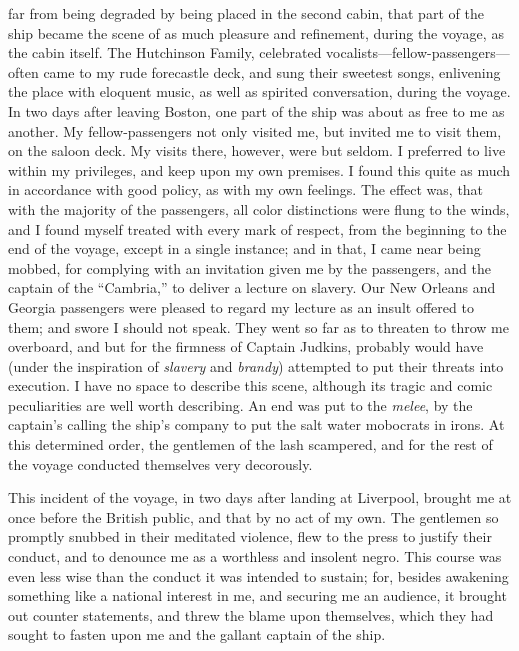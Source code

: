 far from being degraded by being placed in the second cabin, that part
of the ship became the scene of as much pleasure and refinement, during
the voyage, as the cabin itself. The Hutchinson Family, celebrated
vocalists---fellow-passengers---often came to my rude forecastle deck,
and sung their sweetest songs, enlivening the place with eloquent music,
as well as spirited conversation, during the voyage. In two days after
leaving Boston, one part of the ship was about as free to me as another.
My fellow-passengers not only visited me, but invited me to visit them,
on the saloon deck. My visits there, however, were but seldom. I
preferred to live within my {}privileges, and keep upon my own premises.
I found this quite as much in accordance with good policy, as with my
own feelings. The effect was, that with the majority of the passengers,
all color distinctions were flung to the winds, and I found myself
treated with every mark of respect, from the beginning to the end of the
voyage, except in a single instance; and in that, I came near being
mobbed, for complying with an invitation given me by the passengers, and
the captain of the ``Cambria,'' to deliver a lecture on slavery. Our New
Orleans and Georgia passengers were pleased to regard my lecture as an
insult offered to them; and swore I should not speak. They went so far
as to threaten to throw me overboard, and but for the firmness of
Captain Judkins, probably would have (under the inspiration of
\emph{slavery} and \emph{brandy}) attempted to put their threats into
execution. I have no space to describe this scene, although its tragic
and comic peculiarities are well worth describing. An end was put to the
\emph{melee}, by the captain's calling the ship's company to put the
salt water mobocrats in irons. At this determined order, the gentlemen
of the lash scampered, and for the rest of the voyage conducted
themselves very decorously.

This incident of the voyage, in two days after landing at Liverpool,
brought me at once before the British public, and that by no act of my
own. The gentlemen so promptly snubbed in their meditated violence, flew
to the press to justify their conduct, and to denounce me as a worthless
and insolent negro. This course was even less wise than the conduct it
{}was intended to sustain; for, besides awakening something like a
national interest in me, and securing me an audience, it brought out
counter statements, and threw the blame upon themselves, which they had
sought to fasten upon me and the gallant captain of the ship.

